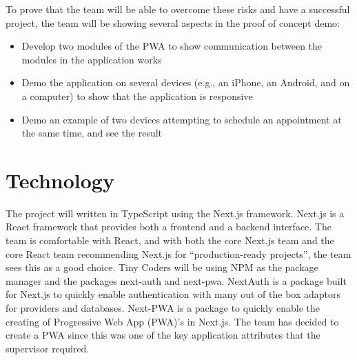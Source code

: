 \documentclass{article}
\begin{document}
To prove that the team will be able to overcome these risks and have a successful project, the team will be showing 
several aspects in the proof of concept demo:

\begin{itemize}
	\item Develop two modules of the PWA to show communication between the modules in the application works
	\item Demo the application on several devices (e.g., an iPhone, an Android, and on a computer) to show that the application is responsive
	\item Demo an example of two devices attempting to schedule an appointment at the same time, and see the result
\end{itemize}

\section{Technology}


The project will written in TypeScript using the Next.js framework. Next.js is a React framework
that provides both a frontend and a backend interface. The team is comfortable with React, and with
both the core Next.js team and the core React team recommending Next.js for
``production-ready projects'', the team sees this as a good choice. Tiny Coders will be using NPM as the package
manager and the packages next-auth and next-pwa. NextAuth is a package built for Next.js to quickly
enable authentication with many out of the box adaptors for providers and databases. Next-PWA is a
package to quickly enable the creating of Progressive Web App (PWA)'s in Next.js. The team has decided to
create a PWA since this was one of the key application attributes that the supervisor required.
\end{document}
